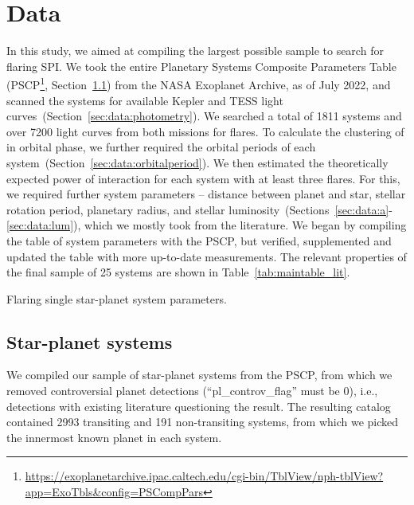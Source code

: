 \documentclass[twocolumn]{aastex631}
\begin{document}
\section{Data}
\label{sec:data}
In this study, we aimed at compiling the largest possible sample to search for flaring SPI. We took the entire Planetary Systems Composite Parameters Table (PSCP\footnote{ \url{https://exoplanetarchive.ipac.caltech.edu/cgi-bin/TblView/nph-tblView?app=ExoTbls&config=PSCompPars}}, Section~\ref{sec:data:sps}) from the NASA Exoplanet Archive, as of July 2022, and scanned the systems for available Kepler and TESS light curves~(Section~\ref{sec:data:photometry}). We searched a total of 1811 systems and over 7200 light curves from both missions for flares. To calculate the clustering of in orbital phase, we further required the orbital periods of each system~(Section~\ref{sec:data:orbitalperiod}). We then estimated the theoretically expected power of interaction for each system with at least three flares. For this, we required further system parameters -- distance between planet and star, stellar rotation period, planetary radius, and stellar luminosity~(Sections~\ref{sec:data:a}-\ref{sec:data:lum}), which we mostly took from the literature. We began by compiling the table of system parameters with the PSCP, but verified, supplemented and updated the table with more up-to-date measurements. The relevant properties of the final sample of 25 systems are shown in Table~\ref{tab:maintable_lit}.


\begin{table*}
\movetableright=-20mm

    \caption{Flaring single star-planet system parameters.}
    
    
        \label{tab:maintable_lit}
    \tablerefs{}
\end{table*}



\subsection{Star-planet systems}
\label{sec:data:sps}
We compiled our sample of star-planet systems from the PSCP, from which we removed controversial planet detections (``pl\_controv\_flag'' must be 0), i.e., detections with existing literature questioning the result. The resulting catalog contained 2993 transiting and 191 non-transiting systems, from which we picked the innermost known planet in each system. 
\end{document}
